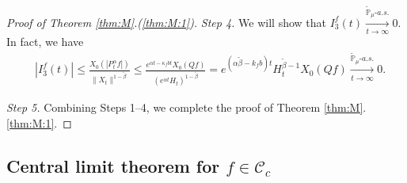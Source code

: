 \documentclass[EJP]{ejpecp} %
\begin{document}
\begin{proof}[Proof of Theorem \ref{thm:M}.(\ref{thm:M:1})]
	\emph{Step 4.} We will show that $I^f_3(t) \xrightarrow[t\to \infty]{\widetilde {\mathbb P}_\mu \text{-} a.s.} 0$.
  In fact, we have
  \begin{align}
    & |I^f_3(t)|
      \leq \frac{X_0(|P^\alpha_tf|)}{\|X_t\|^{1 - \tilde \beta }}
      \leq \frac{e^{\alpha t - \kappa_f b t}X_0(Qf)}{(e^{\alpha t} H_t)^{1 - \tilde \beta}}
      = e^{(\alpha \tilde \beta - k_fb)t} H_t^{\tilde \beta - 1} X_0(Qf)
      \xrightarrow[t\to \infty]{\widetilde {\mathbb P}_\mu \text{-} a.s.} 0.
  \end{align}

  \emph{Step 5.} Combining Steps 1--4, we complete the proof of Theorem  \ref{thm:M}.\eqref{thm:M:1}.
\end{proof}

\subsection{Central limit theorem for $f \in \mathcal C_c$}
\end{document}

